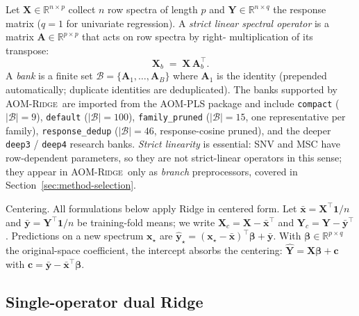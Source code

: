 \documentclass[11pt,a4paper]{article}
\newcommand{\R}{\mathbb{R}}
\newcommand{\Xmat}{\mathbf{X}}
\newcommand{\Ymat}{\mathbf{Y}}
\newcommand{\Yc}{\mathbf{Y}_{\!c}}
\newcommand{\Amat}{\mathbf{A}}
\newcommand{\xvec}{\mathbf{x}}
\newcommand{\yvec}{\mathbf{y}}
\newcommand{\AOMR}{\textsc{AOM-Ridge}\xspace}
\begin{document}
Let $\Xmat\in\R^{n\times p}$ collect $n$ row spectra of length $p$ and
$\Ymat\in\R^{n\times q}$ the response matrix ($q=1$ for univariate
regression). A \emph{strict linear spectral operator} is a matrix
$\Amat\in\R^{p\times p}$ that acts on row spectra by right-
multiplication of its transpose:
\begin{equation}
\Xmat_b \;=\; \Xmat\,\Amat_b^\top.
\label{eq:operator-action}
\end{equation}
A \emph{bank} is a finite set
$\mathcal{B}=\{\Amat_1,\dots,\Amat_B\}$ where $\Amat_1$ is the identity
(prepended automatically; duplicate identities are deduplicated). The
banks supported by \AOMR\ are imported from the AOM-PLS package and
include \texttt{compact} ($|\mathcal{B}|=9$), \texttt{default}
($|\mathcal{B}|=100$), \texttt{family\_pruned} ($|\mathcal{B}|=15$, one
representative per family), \texttt{response\_dedup} ($|\mathcal{B}|=46$,
response-cosine pruned), and the deeper \texttt{deep3} / \texttt{deep4}
research banks. \emph{Strict linearity} is essential: SNV and MSC have
row-dependent parameters, so they are not strict-linear operators in
this sense; they appear in \AOMR\ only as \emph{branch} preprocessors,
covered in Section~\ref{sec:method-selection}.

Centering. All formulations below apply Ridge in centered form. Let
$\bar{\xvec}=\Xmat^\top\bm 1/n$ and
$\bar{\yvec}=\Ymat^\top\bm 1/n$ be training-fold means; we write
$\Xmat_c=\Xmat-\bar{\xvec}^\top$ and $\Yc=\Ymat-\bar{\yvec}^\top$.
Predictions on a new spectrum $\xvec_\star$ are
$\hat{\yvec}_\star=(\xvec_\star-\bar{\xvec})^\top\bm\beta+\bar{\yvec}$.
With $\bm\beta\in\R^{p\times q}$ the original-space coefficient, the
intercept absorbs the centering: $\hat{\Ymat}=\Xmat\bm\beta+\bm c$
with $\bm c=\bar{\yvec}-\bar{\xvec}^\top\bm\beta$.

\subsection{Single-operator dual Ridge}\label{sec:method-single}
\end{document}

